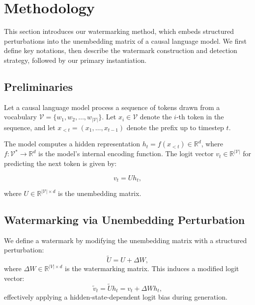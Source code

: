 \section{Methodology}
\label{sec:methodology}

This section introduces our watermarking method, which embeds structured perturbations into the unembedding matrix of a causal language model. We first define key notations, then describe the watermark construction and detection strategy, followed by our primary instantiation.

\subsection{Preliminaries}

Let a causal language model process a sequence of tokens drawn from a vocabulary \( \mathcal{V} = \{w_1, w_2, \dots, w_{|\mathcal{V}|}\} \). Let \( x_i \in \mathcal{V} \) denote the \( i \)-th token in the sequence, and let \( x_{<t} = (x_1, \dots, x_{t-1}) \) denote the prefix up to timestep \( t \).

The model computes a hidden representation \( h_t = f(x_{<t}) \in \mathbb{R}^d \), where \( f: \mathcal{V}^* \rightarrow \mathbb{R}^d \) is the model's internal encoding function. The logit vector \( v_t \in \mathbb{R}^{|\mathcal{V}|} \) for predicting the next token is given by:

\begin{equation}
    v_t = U h_t,
\end{equation}

where \( U \in \mathbb{R}^{|\mathcal{V}| \times d} \) is the unembedding matrix.

\subsection{Watermarking via Unembedding Perturbation}

We define a watermark by modifying the unembedding matrix with a structured perturbation:
\begin{equation}
    \tilde{U} = U + \Delta W,
\end{equation}
where \( \Delta W \in \mathbb{R}^{|V| \times d} \) is the watermarking matrix. This induces a modified logit vector:
\begin{equation}
    \tilde{v}_t = \tilde{U} h_t = v_t + \Delta W h_t,
\end{equation}
effectively applying a hidden-state-dependent logit bias during generation.

